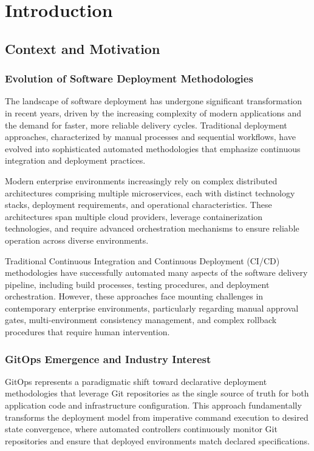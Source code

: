 \chapter{Introduction}

\section{Context and Motivation}

\subsection{Evolution of Software Deployment Methodologies}
The landscape of software deployment has undergone significant transformation in recent years, driven by the increasing complexity of modern applications and the demand for faster, more reliable delivery cycles. Traditional deployment approaches, characterized by manual processes and sequential workflows, have evolved into sophisticated automated methodologies that emphasize continuous integration and deployment practices.

Modern enterprise environments increasingly rely on complex distributed architectures comprising multiple microservices, each with distinct technology stacks, deployment requirements, and operational characteristics. These architectures span multiple cloud providers, leverage containerization technologies, and require advanced orchestration mechanisms to ensure reliable operation across diverse environments.

Traditional Continuous Integration and Continuous Deployment (CI/CD) methodologies have successfully automated many aspects of the software delivery pipeline, including build processes, testing procedures, and deployment orchestration. However, these approaches face mounting challenges in contemporary enterprise environments, particularly regarding manual approval gates, multi-environment consistency management, and complex rollback procedures that require human intervention.

\subsection{GitOps Emergence and Industry Interest}
GitOps represents a paradigmatic shift toward declarative deployment methodologies that leverage Git repositories as the single source of truth for both application code and infrastructure configuration. This approach fundamentally transforms the deployment model from imperative command execution to desired state convergence, where automated controllers continuously monitor Git repositories and ensure that deployed environments match declared specifications.

